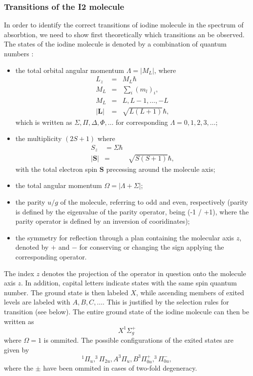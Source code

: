 \subsubsection{Transitions of the I2 molecule}
In order to identify the correct transitions of iodine molecule in 
the spectrum of absorbtion, we need to show first theoretically which 
transitions an be observed. 
The states of the iodine molecule is denoted by a combination of 
quantum numbers \cite{herzberg1950spectra}:
\begin{itemize}
    \item the total orbital angular momentum $\Lambda = |M_L|$, where 
        \begin{eqnarray*}
            L_z &=& M_L \hbar \\
            M_L &=& \sum_i (m_l)_i, \\
            M_L &=& L, L - 1, \ldots, -L \\
            |\mathbf{L}| &=& \sqrt{L (L + 1)} \hbar, 
        \end{eqnarray*}
        which is written as $\Sigma, \Pi, \Delta, \Phi, \ldots$ for corresponding 
        $\Lambda = 0, 1, 2, 3, \ldots$;
    \item the multiplicity $(2S + 1)$ where
        \begin{eqnarray*}
            S_z &= \Sigma \hbar \\
            |\mathbf{S}| &=& \sqrt{S (S + 1)} \hbar, 
        \end{eqnarray*}
        with the total electron spin $\mathbf{S}$ precessing around the 
        molecule axis;
    \item the total angular momentum $\Omega = |\Lambda + \Sigma|$;
    \item the parity $u / g$ of the molecule, referring to odd and even, 
        respectively (parity is defined by the eigenvalue of 
        the parity operator, being (-1 / +1), where the parity operator 
        is defined by an inversion of cooridinates);    
    \item the symmetry for reflection through a plan containing the 
        molecular axis $z$, denoted by $+$ and $-$ for conserving or 
        changing the sign applying the corresponding operator.
\end{itemize}
The index $z$ denotes the projection of the operator in question onto the 
molecule axis $z$. In addition, capital letters indicate states with the same 
spin quantum number. The ground state is then labeled $X$, while ascending 
members of exited levels are labeled with $A, B, C, \ldots$. This is justified 
by the selection rules for transition (see below). 
The entire ground state of the iodine molecule can then be written as
\begin{equation}
    X ^1\Sigma_g^+
\end{equation}
where $\Omega = 1$ is ommited. The possible configurations of the exited states 
are given by
\begin{equation}
    ^1\Pi_u, ^3\Pi_{2u}, A ^3\Pi_{u}, B ^3\Pi_{0u}^+, ^3\Pi_{0u}^-,
\end{equation}
where the $\pm$ have been ommited in cases of two-fold degeneracy. 

